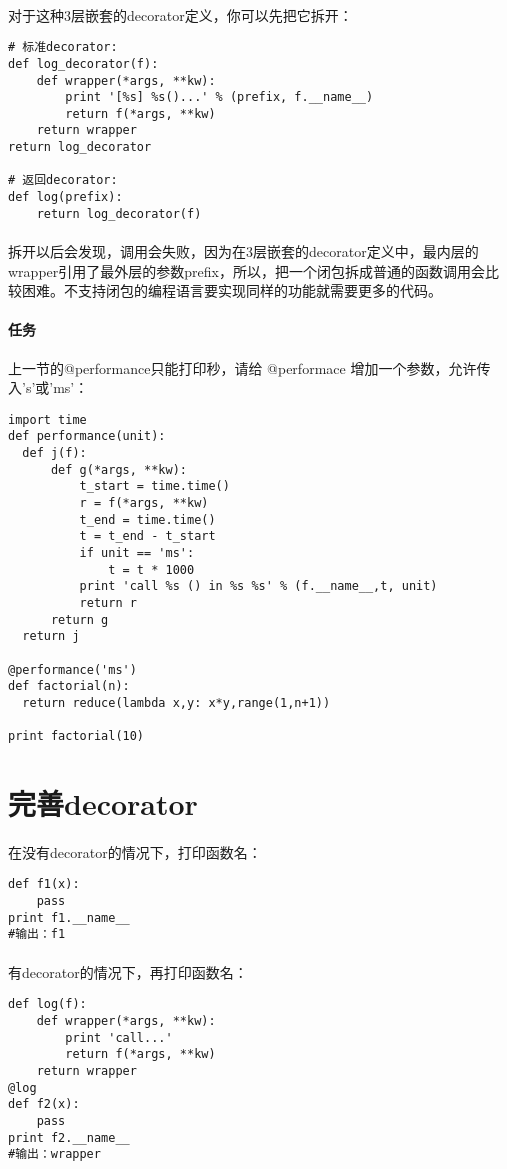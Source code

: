 \documentclass{article}
\begin{document}
\begin{CJK}{UTF8}{gbsn}
\paragraph{}
对于这种3层嵌套的decorator定义，你可以先把它拆开：
\begin{verbatim}
# 标准decorator:
def log_decorator(f):
    def wrapper(*args, **kw):
        print '[%s] %s()...' % (prefix, f.__name__)
        return f(*args, **kw)
    return wrapper
return log_decorator

# 返回decorator:
def log(prefix):
    return log_decorator(f)
\end{verbatim}
\paragraph{}
拆开以后会发现，调用会失败，因为在3层嵌套的decorator定义中，最内层的wrapper引用了最外层的参数prefix，所以，把一个闭包拆成普通的函数调用会比较困难。不支持闭包的编程语言要实现同样的功能就需要更多的代码。
\paragraph{任务}
上一节的@performance只能打印秒，请给 @performace 增加一个参数，允许传入's'或'ms'：
\begin{verbatim}
import time
def performance(unit):
  def j(f):
      def g(*args, **kw):
          t_start = time.time()
          r = f(*args, **kw)
          t_end = time.time()
          t = t_end - t_start
          if unit == 'ms':
              t = t * 1000
          print 'call %s () in %s %s' % (f.__name__,t, unit)
          return r
      return g
  return j
  
@performance('ms')
def factorial(n):
  return reduce(lambda x,y: x*y,range(1,n+1))
  
print factorial(10)
\end{verbatim}
\section{完善decorator}
\paragraph{}
在没有decorator的情况下，打印函数名：
\begin{verbatim}
def f1(x):
    pass
print f1.__name__
#输出：f1
\end{verbatim}
\paragraph{}
有decorator的情况下，再打印函数名：
\begin{verbatim}
def log(f):
    def wrapper(*args, **kw):
        print 'call...'
        return f(*args, **kw)
    return wrapper
@log
def f2(x):
    pass
print f2.__name__
#输出：wrapper
\end{verbatim}

\end{CJK}
\end{document}
